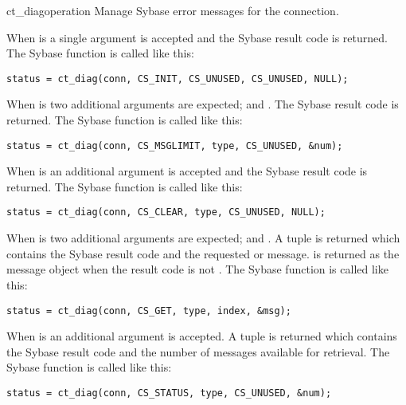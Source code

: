 \begin{methoddesc}[CS_CONNECTION]{ct_diag}{operation \optional{, \ldots}}
Manage Sybase error messages for the connection.

When  is  a single argument is accepted
and the Sybase result code is returned.  The Sybase
 function is called like this:

\begin{verbatim}
status = ct_diag(conn, CS_INIT, CS_UNUSED, CS_UNUSED, NULL);
\end{verbatim}

When  is  two additional arguments
are expected;  and .  The Sybase result code is
returned.  The Sybase  function is called like this:

\begin{verbatim}
status = ct_diag(conn, CS_MSGLIMIT, type, CS_UNUSED, &num);
\end{verbatim}

When  is  an additional 
argument is accepted and the Sybase result code is returned.  The
Sybase  function is called like this:

\begin{verbatim}
status = ct_diag(conn, CS_CLEAR, type, CS_UNUSED, NULL);
\end{verbatim}

When  is  two additional arguments are
expected;  and .  A tuple is returned which
contains the Sybase result code and the requested 
or  message.   is returned as the
message object when the result code is not .  The
Sybase  function is called like this:

\begin{verbatim}
status = ct_diag(conn, CS_GET, type, index, &msg);
\end{verbatim}

When  is  an additional 
argument is accepted.  A tuple is returned which contains the Sybase
result code and the number of messages available for retrieval.  The
Sybase  function is called like this:

\begin{verbatim}
status = ct_diag(conn, CS_STATUS, type, CS_UNUSED, &num);
\end{verbatim}


\end{methoddesc}
